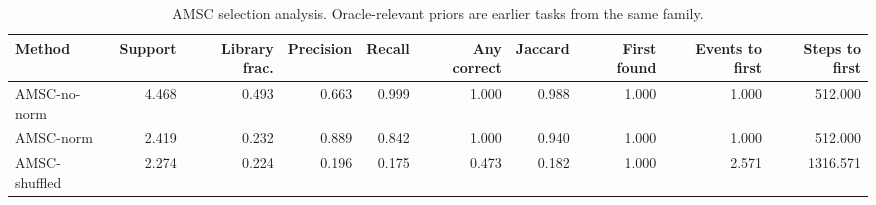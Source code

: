 \begin{table}[ht]
    \caption{AMSC selection analysis. Oracle-relevant priors are earlier tasks from the same family.}
    \label{tbl:amsc_selection}
    \centering
    \scriptsize
    \begin{tabular}{lrrrrrrrrr}
    \toprule
Method & Support & Library frac. & Precision & Recall & Any correct & Jaccard & First found & Events to first & Steps to first \\
    \midrule
AMSC-no-norm & 4.468 & 0.493 & 0.663 & 0.999 & 1.000 & 0.988 & 1.000 & 1.000 & 512.000 \\
AMSC-norm & 2.419 & 0.232 & 0.889 & 0.842 & 1.000 & 0.940 & 1.000 & 1.000 & 512.000 \\
AMSC-shuffled & 2.274 & 0.224 & 0.196 & 0.175 & 0.473 & 0.182 & 1.000 & 2.571 & 1316.571 \\
    \bottomrule
    \end{tabular}
\end{table}
